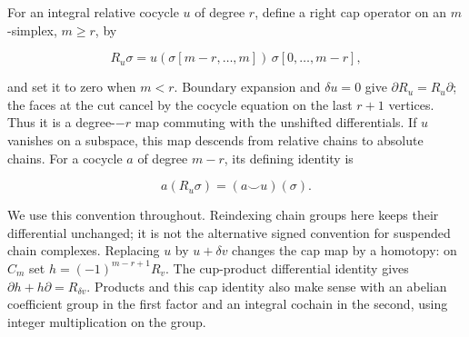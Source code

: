 For an integral relative cocycle \(u\) of degree \(r\), define a right cap operator on an \(m\)-simplex, \(m\geq r\), by

\[
R_u\sigma=u(\sigma[m-r,\ldots,m])\,\sigma[0,\ldots,m-r],
\]

and set it to zero when \(m<r\). Boundary expansion and \(\delta u=0\) give
\(\partial R_u=R_u\partial\); the faces at the cut cancel by the cocycle equation on the last \(r+1\) vertices. Thus it is a degree-\(-r\) map commuting with the unshifted differentials. If \(u\) vanishes on a subspace, this map descends from relative chains to absolute chains. For a cocycle \(a\) of degree \(m-r\), its defining identity is

\[
a(R_u\sigma)=(a\smile u)(\sigma).
\]

We use this convention throughout. Reindexing chain groups here keeps their differential unchanged; it is not the alternative signed convention for suspended chain complexes. Replacing \(u\) by \(u+\delta v\) changes the cap map by a homotopy: on \(C_m\) set \(h=(-1)^{m-r+1}R_v\). The cup-product differential identity gives \(\partial h+h\partial=R_{\delta v}\). Products and this cap identity also make sense with an abelian coefficient group in the first factor and an integral cochain in the second, using integer multiplication on the group.

